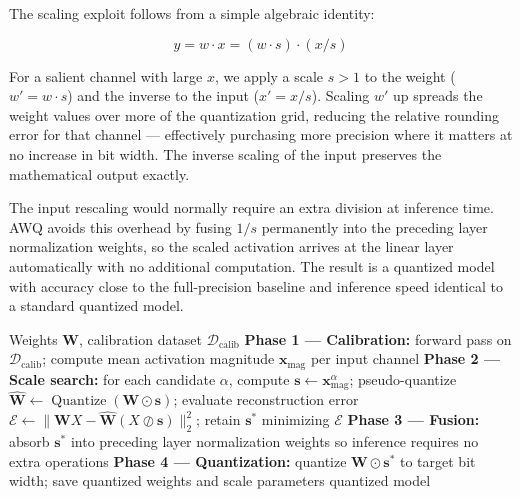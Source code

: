 \documentclass{book}
\begin{document}
The scaling exploit follows from a simple algebraic identity:

\begin{equation}
\label{eq:awq_identity}
y = w \cdot x = (w \cdot s) \cdot (x / s)
\end{equation}

For a salient channel with large $x$, we apply a scale $s > 1$ to the
weight ($w' = w \cdot s$) and the inverse to the input ($x' = x / s$).
Scaling $w'$ up spreads the weight values over more of the quantization
grid, reducing the relative rounding error for that channel --- effectively
purchasing more precision where it matters at no increase in bit width.
The inverse scaling of the input preserves the mathematical output exactly.

The input rescaling would normally require an extra division at inference
time. AWQ avoids this overhead by fusing $1/s$ permanently into the
preceding layer normalization weights, so the scaled activation arrives
at the linear layer automatically with no additional computation. The
result is a quantized model with accuracy close to the full-precision
baseline and inference speed identical to a standard quantized model.

\begin{algorithm}[H]
\caption{AWQ: Activation-Aware Weight Quantization}
\label{alg:awq}
\begin{algorithmic}[1]
\Require Weights $\mathbf{W}$, calibration dataset $\mathcal{D}_{\text{calib}}$
\State \textbf{Phase 1 --- Calibration:} forward pass on
    $\mathcal{D}_{\text{calib}}$; compute mean activation magnitude
    $\mathbf{x}_{\text{mag}}$ per input channel
\State \textbf{Phase 2 --- Scale search:} for each candidate $\alpha$,
    compute $\mathbf{s} \leftarrow \mathbf{x}_{\text{mag}}^\alpha$;
    pseudo-quantize $\hat{\mathbf{W}} \leftarrow
    \operatorname{Quantize}(\mathbf{W} \odot \mathbf{s})$;
    evaluate reconstruction error
    $\mathcal{E} \leftarrow \|\mathbf{W}X -
    \hat{\mathbf{W}}(X \oslash \mathbf{s})\|_2^2$;
    retain $\mathbf{s}^*$ minimizing $\mathcal{E}$
\State \textbf{Phase 3 --- Fusion:} absorb $\mathbf{s}^*$ into preceding
    layer normalization weights so inference requires no extra operations
\State \textbf{Phase 4 --- Quantization:} quantize
    $\mathbf{W} \odot \mathbf{s}^*$ to target bit width; save quantized
    weights and scale parameters
\State \Return quantized model
\end{algorithmic}
\end{algorithm}
\end{document}
